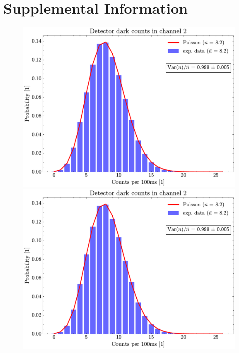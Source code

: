 \chapter{Supplemental Information}

\begin{figure}[h!]
	\noindent
	\begin{minipage}{0.33\textwidth}
		\includegraphics[page=1,width=\linewidth]{Images/DC_chAll.pdf}
	\end{minipage}%
	\begin{minipage}{0.33\textwidth}
		\includegraphics[page=2,width=\linewidth]{Images/DC_chAll.pdf}
	\end{minipage}%
	\begin{minipage}{0.33\textwidth}

\end{minipage}
\end{figure}
